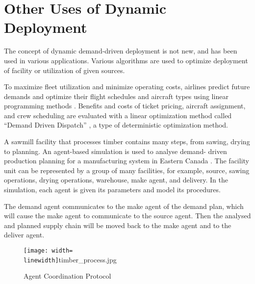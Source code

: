\section{Other Uses of Dynamic Deployment}
The concept of dynamic demand-driven deployment is not new,
and has been used in various applications. Various algorithms
are used to optimize deployment of facility or utilization
of given sources.

To maximize fleet utilization and minimize
operating costs, airlines predict future demands
and optimize their flight schedules and aircraft
types using linear programming methods \cite{berge_demand_1993}.
Benefits and costs of ticket pricing, aircraft assignment, and crew scheduling are
evaluated with a linear optimization method called ``Demand Driven Dispatch''
\cite{shebalov_practical_2009}, a type of deterministic optimization method.

A sawmill facility that processes timber contains 
many steps, from sawing, drying to planning. An
agent-based simulation is used to analyse demand-
driven production planning for a manufacturing system in Eastern Canada \cite{yáñez_agent-based_2009}.
The facility unit can be represented by a group of many facilities,
for example, source, sawing operations, drying operations, warehouse,
make agent, and delivery. In the simulation, each agent is given its parameters
and model its procedures.

The demand agent communicates to the make agent of the demand plan,
which will cause the make agent to communicate to the source agent. Then the
analysed and planned supply chain will be moved back to the make agent and
to the deliver agent.

\begin{figure}
	\texttt{[image: width=\\linewidth]}{timber_process.jpg}
	\caption{Agent Coordination Protocol}
	\label{fig:timber_process}
	\cite{yáñez_agent-based_2009}
\end{figure}
